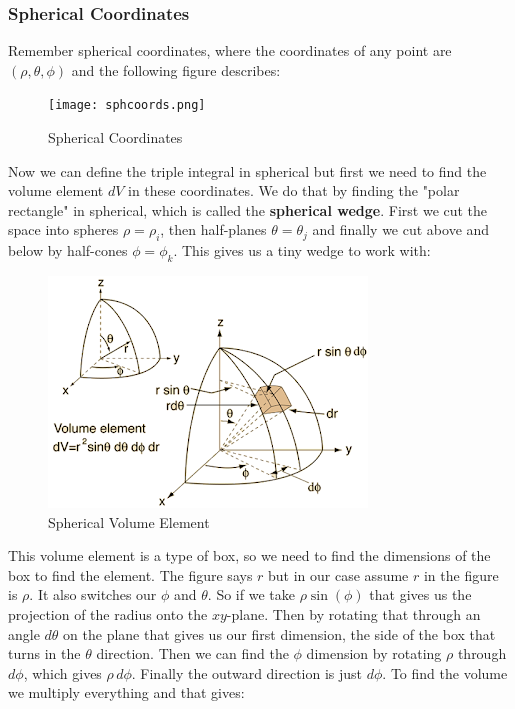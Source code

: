 \documentclass{article}
\begin{document}
\subsubsection{Spherical Coordinates}
Remember spherical coordinates, where the coordinates of any point are $(\rho, \theta, \phi)$ and the following figure describes:
\begin{figure}[H]
\begin{center}
\texttt{[image: sphcoords.png]}
\caption{Spherical Coordinates}
\label{sphcoords}
\end{center}
\end{figure}
Now we can define the triple integral in spherical but first we need to find the volume element $dV$ in these coordinates. We do that by finding the "polar rectangle" in spherical, which is called the \textbf{spherical wedge}. First we cut the space into spheres $\rho = \rho_i$, then half-planes $\theta = \theta_j$ and finally we cut above and below by half-cones $\phi = \phi_k$. This gives us a tiny wedge to work with:
\begin{figure}[H]
\begin{center}
\includegraphics[scale=0.7,angle=0]{sphcoordel.png}
\caption{Spherical Volume Element}
\label{sphvol}
\end{center}
\end{figure}
This volume element is a type of box, so we need to find the dimensions of the box to find the element. The figure says $r$ but in our case assume $r$ in the figure is $\rho$. It also switches our $\phi$ and $\theta$. So if we take $\rho \sin(\phi)$ that gives us the projection of the radius onto the $xy$-plane. Then by rotating that through an angle $d\theta$ on the plane that gives us our first dimension, the side of the box that turns in the $\theta$ direction. Then we can find the $\phi$ dimension by rotating $\rho$ through $d\phi$, which gives $\rho \, d\phi$. Finally the outward direction is just $d\phi$. To find the volume we multiply everything and that gives:
\end{document}
